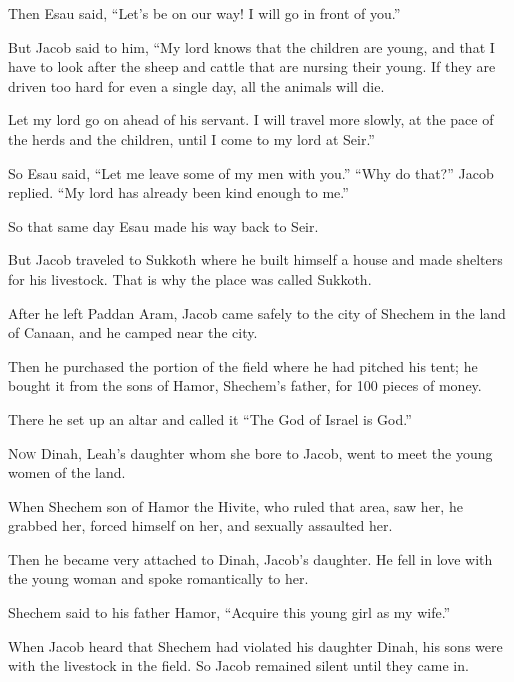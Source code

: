 \begin{scripture}
 Then Esau said, ``Let's be on our way! I will go in front of you.''
 But Jacob said to him, ``My lord knows that the children are young, and that I have to look after the sheep and cattle that are nursing their young. If they are driven too hard for even a single day, all the animals will die.
 Let my lord go on ahead of his servant. I will travel more slowly, at the pace of the herds and the children, until I come to my lord at Seir.''
\everypar{}

 So Esau said, ``Let me leave some of my men with you.'' ``Why do that?'' Jacob replied. ``My lord has already been kind enough to me.''
\everypar{}

 So that same day Esau made his way back to Seir.
 But Jacob traveled to Sukkoth where he built himself a house and made shelters for his livestock. That is why the place was called Sukkoth.
\everypar{}

 After he left Paddan Aram, Jacob came safely to the city of Shechem in the land of Canaan, and he camped near the city.
 Then he purchased the portion of the field where he had pitched his tent; he bought it from the sons of Hamor, Shechem's father, for 100 pieces of money.
 There he set up an altar and called it ``The God of Israel is God.''

 \allowchapbreak\hypertarget{ch-genesis-34}{}\lettrine[lines=5]{\color{pentateuch}N}{\textsc{ow}} Dinah, Leah's daughter whom she bore to Jacob, went to meet the young women of the land.\everypar{}
 When Shechem son of Hamor the Hivite, who ruled that area, saw her, he grabbed her, forced himself on her, and sexually assaulted her.
 Then he became very attached to Dinah, Jacob's daughter. He fell in love with the young woman and spoke romantically to her.
 Shechem said to his father Hamor, ``Acquire this young girl as my wife.''
 When Jacob heard that Shechem had violated his daughter Dinah, his sons were with the livestock in the field. So Jacob remained silent until they came in.
\everypar{}


\end{scripture}
